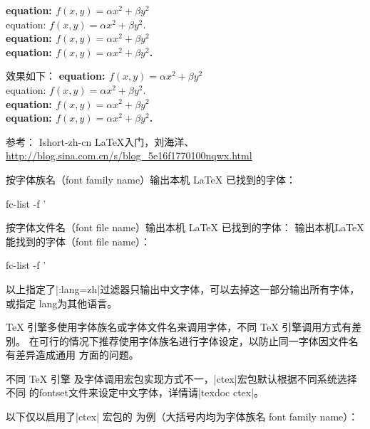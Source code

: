 \begin{itemize}
\begin{texlist}
  {\bfseries equation: $f(x,y) = \alpha x^2 + \beta y^2$}\\
  equation: $f(x,y) = \alpha x^2 + \beta y^2$.\\
  \bfseries equation: $f(x,y) = \alpha x^2 + \beta y^2$\\
  equation: $f(x,y) = \alpha x^2 + \beta y^2$.\\
  
  \end{texlist}
  效果如下：
  {\bfseries equation: $f(x,y) = \alpha x^2 + \beta y^2$}\\
  equation: $f(x,y) = \alpha x^2 + \beta y^2$.\\
  \bfseries equation: $f(x,y) = \alpha x^2 + \beta y^2$\\
  equation: $f(x,y) = \alpha x^2 + \beta y^2$.\\
\end{itemize}
  参考： Ishort-zh-cn LaTeX入门，刘海洋、\url{http://blog.sina.com.cn/s/blog_5e16f1770100nqwx.html}



按字体族名（font family name）输出本机 \LaTeX{} 已找到的字体：
\begin{shcode}
 fc-list -f '%
\end{shcode}

按字体文件名（font file name）输出本机 \LaTeX{} 已找到的字体：
输出本机LaTeX能找到的字体（font file name）：
\begin{shcode}
 fc-list -f '%
\end{shcode}

以上指定了|:lang=zh|过滤器只输出中文字体，可以去掉这一部分输出所有字体，或指定
lang为其他语言。


\TeX{} 引擎多使用字体族名或字体文件名来调用字体，不同 \TeX{} 引擎调用方式有差别。
在可行的情况下推荐使用字体族名进行字体设定，以防止同一字体因文件名有差异造成通用
方面的问题。

不同 \TeX{} 引擎 及字体调用宏包实现方式不一，|ctex|宏包默认根据不同系统选择不同
的fontset文件来设定中文字体，详情请|texdoc ctex|。

以下仅以启用了|ctex| 宏包的 \XeLaTeX{} 为例（大括号内均为字体族名 font family name）：
\begin{texlist}
\setmainfont{Libertinus Serif}
\setsansfont{TeX Gyre Heros}
\setmonofont{Libertinus Mono}


\end{texlist}

